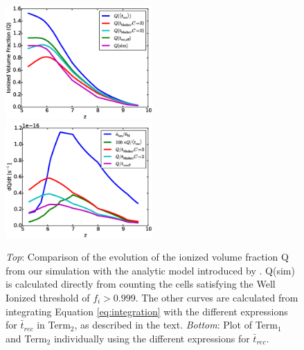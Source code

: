 \begin{figure}
    \includegraphics[width=0.5\textwidth]{Qeffv1.eps}
    \includegraphics[width=0.5\textwidth]{term1vsterm2.eps}
    \caption{{\em Top}: Comparison of the evolution of the ionized volume fraction Q from our simulation with the analytic model introduced by \cite{MadauEtAl1999}.  Q(sim) is calculated directly from counting the cells satisfying the Well Ionized threshold of $f_i>0.999$. The other curves are calculated from integrating Equation \eqref{eq:integration} with the different expressions for $\bar{t}_{rec}$ in Term$_2$, as described in the text.  {\em Bottom}:  Plot of Term$_1$ and Term$_2$ individually using the different expressions for $\bar{t}_{rec}$.}
    \label{Qeffv1}
\end{figure}


